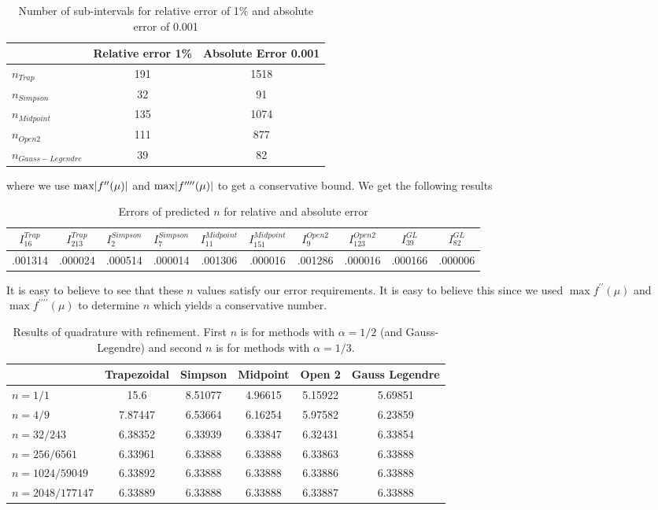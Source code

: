 \documentclass[12pt]{article}
\DeclarePairedDelimiter \abs{\lvert}{\rvert}%
\theoremstyle{remark}
\begin{document}
\begin{table}[H]
	\centering
	\begin{tabular}{||l|c|c||}
		\cline{2-3}
		\multicolumn{1}{c|}{} & Relative error 1\% & Absolute Error 0.001 \\ \hline \hline
		$n_{Trap}$ & 191 & 1518 \\ \hline
		$n_{Simpson}$ & 32 & 91 \\ \hline
		$n_{Midpoint}$ & 135 & 1074 \\ \hline
		$n_{Open2}$ & 111 & 877 \\ \hline
		$n_{Gauss-Legendre}$ & 39 & 82 \\ \hline
	\end{tabular}
	\caption{Number of sub-intervals for relative error of 1\% and absolute error of 0.001}
\end{table}
where we use $\max \abs{f^{\prime\prime}(\mu)}$ and $\max \abs{f^{\prime\prime\prime\prime}(\mu)}$ to get a conservative bound. We get the following results
\begin{table}[H]
	\centering
	\begin{tabular}{||c|c|c|c|c|c|c|c|c|c||}
	\hline
	 $I_{16}^{Trap}$ & $I_{213}^{Trap}$ & $I_{2}^{Simpson}$ & $I_{7}^{Simpson}$ & $I_{11}^{Midpoint}$ & $I_{151}^{Midpoint}$ & $I_{9}^{Open2}$ & $I_{123}^{Open2}$ & $I_{39}^{GL}$ & $I_{82}^{GL}$ \\ \hline \hline
	.001314 & .000024 & .000514 & .000014 & .001306 & .000016 & .001286 & .000016 & .000166 & .000006 \\ \hline
	\end{tabular} 
	\caption{Errors of predicted $n$ for relative and absolute error}
\end{table}
It is easy to believe to see that these $n$ values satisfy our error requirements. It is easy to believe this since we used $\max f^{\prime\prime}(\mu)$ and $\max f^{\prime\prime\prime\prime}(\mu)$ to determine $n$ which yields a conservative number.
\begin{table}[H]
	\centering
	\begin{tabular}{||l|c|c|c|c|c||}
		\cline{2-6}
		\multicolumn{1}{c|}{} & Trapezoidal & Simpson & Midpoint & Open 2 & Gauss Legendre \\ \hline \hline
		$n=1/1$ & 15.6 & 8.51077 & 4.96615 & 5.15922 & 5.69851 \\ \hline
		$n=4/9$ & 7.87447 & 6.53664 & 6.16254 & 5.97582 & 6.23859 \\ \hline
		$n=32/243$ & 6.38352 & 6.33939 & 6.33847 & 6.32431 & 6.33854 \\ \hline
		$n=256/6561$ & 6.33961 & 6.33888 & 6.33888 & 6.33863 & 6.33888 \\ \hline
		$n=1024/59049$ & 6.33892 & 6.33888 & 6.33888 & 6.33886 & 6.33888 \\ \hline
		$n=2048/177147$ & 6.33889 & 6.33888 & 6.33888 & 6.33887 & 6.33888 \\ \hline
	\end{tabular}
	\caption{Results of quadrature with refinement. First $n$ is for methods with $\alpha = 1/2$ (and Gauss-Legendre) and second $n$ is for methods with $\alpha = 1/3$.}
\end{table}	 
\end{document}
